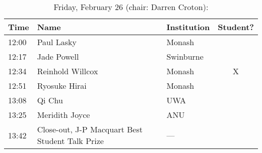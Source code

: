 \documentclass[amsmath,onecolumn]{revtex4-1}
\begin{document}
\begin{table}[!htbp]
	\centering
	\caption{Friday, February 26 (chair: Darren Croton):}
\begin{tabular}{| l | l | l | c |}
	\hline
	Time & Name  & Institution & Student? \\ 		
	\hline
	12:00 & Paul	Lasky & Monash & \\
	12:17 & Jade	Powell & Swinburne & \\
	12:34 & Reinhold Willcox &  Monash & X \\
	12:51 & Ryosuke	Hirai  & Monash & \\
	13:08 & Qi	Chu & UWA & \\
	13:25 & Meridith	Joyce & ANU  & \\
	13:42 & Close-out, J-P Macquart Best Student Talk Prize & --- & \\
	\hline
\end{tabular}
\end{table}
\end{document}
